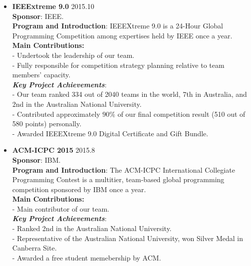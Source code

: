 \documentclass{res}
\begin{document}
\begin{resume}
\begin{CJK*}{UTF8}{song}
\begin{itemize}
\itemsep -2pt %
  \item{\bf IEEExtreme 9.0} \hfill 2015.10 \vspace{3pt} \\
		\textbf{Sponsor}: IEEE. \vspace{3pt} \\
		\textbf{Program and Introduction}: IEEEXtreme 9.0 is a 24-Hour Global Programming Competition among expertises held by IEEE once a year. \vspace{3pt} \\
		\textbf{Main Contributions:} \vspace{3pt} \\
		- Undertook the leadership of our team. \\
		- Fully responsible for competition strategy planning relative to team members' capacity. \vspace{3pt} \\		
		\textit{\textbf{Key Project Achievements}}: \vspace{3pt} \\
		- Our team ranked 334 out of 2040 teams in the world, 7th in Australia, and 2nd in the Australian National University. \\
		- Contributed approximately $90\%$ of our final competition result (510 out of 580 points) personally. \\
		- Awarded IEEEXtreme 9.0 Digital Certificate and Gift Bundle. \\
        
  \item{\bf ACM-ICPC 2015} \hfill 2015.8 \vspace{3pt} \\
  		\textbf{Sponsor}: IBM. \vspace{3pt} \\
		\textbf{Program and Introduction}: The ACM-ICPC International Collegiate Programming Contest is a multitier, team-based global programming competition sponsored by IBM once a year. \vspace{3pt} \\
		\textbf{Main Contributions:} \vspace{3pt} \\
		- Main contributor of our team. \vspace{3pt} \\
		\textit{\textbf{Key Project Achievements}}: \vspace{3pt} \\
		- Ranked 2nd in the Australian National University. \\
		- Representative of the Australian National University, won Silver Medal in Canberra Site. \\
		- Awarded a free student memebership by ACM.
			

\end{itemize}
\end{CJK*}
\end{resume}
\end{document}
